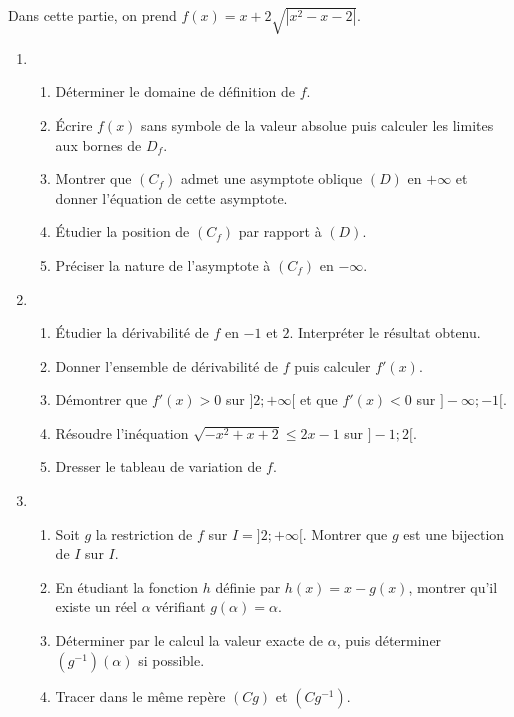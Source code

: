 \documentclass[12pt]{article}
\begin{document}
Dans cette partie, on prend $f(x) = x + 2\sqrt{|x^2 - x - 2|}$.

\begin{enumerate}
    \item 
\begin{enumerate}
		\item[(a)] Déterminer le domaine de définition de $f$.
    \item[(b)] Écrire $f(x)$ sans symbole de la valeur absolue puis calculer les limites aux bornes de $D_f$.
    \item[(c)] Montrer que $(C_f)$ admet une asymptote oblique $(D)$ en $+\infty$ et donner l’équation de cette asymptote.
    \item[(d)] Étudier la position de $(C_f)$ par rapport à $(D)$.
    \item[(e)] Préciser la nature de l’asymptote à $(C_f)$ en $-\infty$.
\end{enumerate}

\item
\begin{enumerate}
    \item[(a)] Étudier la dérivabilité de $f$ en $-1$ et $2$. Interpréter le résultat obtenu.
    \item[(b)] Donner l’ensemble de dérivabilité de $f$ puis calculer $f'(x)$.
    \item[(c)] Démontrer que $f'(x) > 0$ sur $]2; +\infty[$ et que $f'(x) < 0$ sur $]-\infty; -1[$.
    \item[(d)] Résoudre l’inéquation $\sqrt{-x^2 + x + 2} \leq 2x - 1$ sur $]-1; 2[$.
    \item[(e)] Dresser le tableau de variation de $f$.
\end{enumerate}

\item
\begin{enumerate}
    \item[(a)] Soit $g$ la restriction de $f$ sur $I = ]2; +\infty[$. Montrer que $g$ est une bijection de $I$ sur $I$.
    \item[(b)] En étudiant la fonction $h$ définie par $h(x) = x - g(x)$, montrer qu’il existe un réel $\alpha$ vérifiant $g(\alpha) = \alpha$.
    \item[(c)] Déterminer par le calcul la valeur exacte de $\alpha$, puis déterminer $(g^{-1})(\alpha)$ si possible.
    \item[(d)] Tracer dans le même repère $(Cg)$ et $(Cg^{-1})$.
\end{enumerate}
\end{enumerate}
\end{document}
